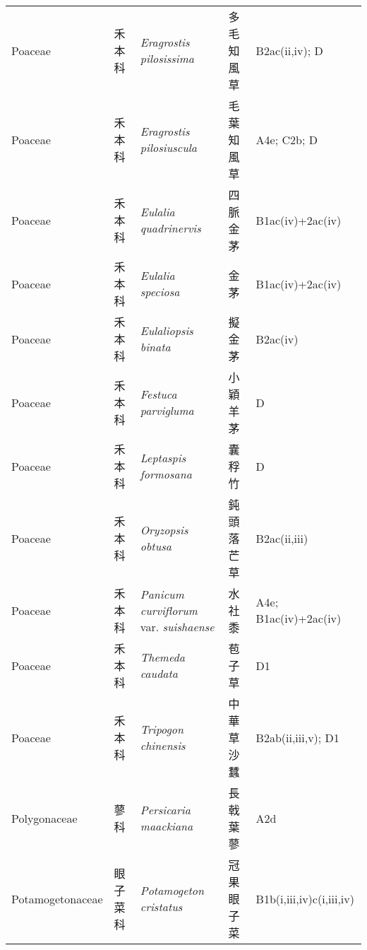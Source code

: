 {\begin{longtable}{p{2.5cm}p{2.5cm}p{4.5cm}p{2.5cm}p{3cm}}
    Poaceae & 禾本科 & \textit{Eragrostis pilosissima}  & 多毛知風草 & B2ac(ii,iv); D \index{Eragrostis@\textit{Eragrostis}!pilosissima@\textit{pilosissima}}  \index{多毛知風草} \\
    Poaceae & 禾本科 & \textit{Eragrostis pilosiuscula}  & 毛葉知風草 & A4e; C2b; D \index{Eragrostis@\textit{Eragrostis}!pilosiuscula@\textit{pilosiuscula}}  \index{毛葉知風草} \\
    Poaceae & 禾本科 & \textit{Eulalia quadrinervis}  & 四脈金茅 & B1ac(iv)+2ac(iv) \index{Eulalia@\textit{Eulalia}!quadrinervis@\textit{quadrinervis}}  \index{四脈金茅} \\
    Poaceae & 禾本科 & \textit{Eulalia speciosa}  & 金茅 & B1ac(iv)+2ac(iv) \index{Eulalia@\textit{Eulalia}!speciosa@\textit{speciosa}}  \index{金茅} \\
    Poaceae & 禾本科 & \textit{Eulaliopsis binata}  & 擬金茅 & B2ac(iv) \index{Eulaliopsis@\textit{Eulaliopsis}!binata@\textit{binata}}  \index{擬金茅} \\
    Poaceae & 禾本科 & \textit{Festuca parvigluma}  & 小穎羊茅 & D \index{Festuca@\textit{Festuca}!parvigluma@\textit{parvigluma}}  \index{小穎羊茅} \\
    Poaceae & 禾本科 & \textit{Leptaspis formosana}  & 囊稃竹 & D \index{Leptaspis@\textit{Leptaspis}!formosana@\textit{formosana}}  \index{囊稃竹} \\
    Poaceae & 禾本科 & \textit{Oryzopsis obtusa}  & 鈍頭落芒草 & B2ac(ii,iii) \index{Oryzopsis@\textit{Oryzopsis}!obtusa@\textit{obtusa}}  \index{鈍頭落芒草} \\
    Poaceae & 禾本科 & \textit{Panicum curviflorum} var. \textit{suishaense}  & 水社黍 & A4e; B1ac(iv)+2ac(iv) \index{Panicum@\textit{Panicum}!curviflorum@\textit{curviflorum}!var. suishaense@var. \textit{suishaense}}  \index{水社黍} \\
    Poaceae & 禾本科 & \textit{Themeda caudata}  & 苞子草 & D1 \index{Themeda@\textit{Themeda}!caudata@\textit{caudata}}  \index{苞子草} \\
    Poaceae & 禾本科 & \textit{Tripogon chinensis}  & 中華草沙蠶 & B2ab(ii,iii,v); D1 \index{Tripogon@\textit{Tripogon}!chinensis@\textit{chinensis}}  \index{中華草沙蠶} \\
    Polygonaceae & 蓼科 & \textit{Persicaria maackiana}  & 長戟葉蓼 & A2d \index{Persicaria@\textit{Persicaria}!maackiana@\textit{maackiana}}  \index{長戟葉蓼} \\
    Potamogetonaceae & 眼子菜科 & \textit{Potamogeton cristatus}  & 冠果眼子菜 & B1b(i,iii,iv)c(i,iii,iv) \index{Potamogeton@\textit{Potamogeton}!cristatus@\textit{cristatus}}  \index{冠果眼子菜} \\

\end{longtable}}
